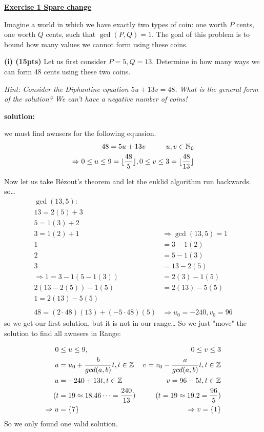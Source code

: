 \documentclass{article}
\begin{document}
\Large
\textbf{\underline{Exercise 1
Spare change}}

Imagine a world in which we have exactly two types of coin: 
one worth $P$ cents, 
one worth $Q$ cents, 
such that $\gcd(P,Q) = 1$. The goal of this
problem is to bound how many values we cannot form using these coins. 


\textbf{(i) (15pts)}
Let us first consider $P = 5, Q = 13$. Determine in how many
ways we can form 48 cents using these two coins.

\textit{
Hint: Consider the Diphantine equation $5u+13v=48$.
What is the general form of the solution? We can't have a negative number of coins!
}

\textbf{solution:} 

we must find awnsers for the following equasion.
\begin{align*}
    48 = 5u + 13v \hspace{1cm} u, v \in \mathbb{N}_{0} \\
    \Rightarrow
    0 \leq u \leq 9 = \lfloor \frac{48}{5} \rfloor, 
    0 \leq v \leq 3 = \lfloor \frac{48}{13} \rfloor
\end{align*}


Now let us take Bézout's theorem and let 
the euklid algorithm run backwards. so\dots
\begin{align*}
    \gcd(13,5): \\
    13 = 2(5) + 3& \\
    5 = 1(3) + 2& \\
    3 = 1(2) + 1& 
    \Rightarrow \gcd(13,5) = 1 \\
    1 &= 3 - 1(2) \\
                 2 &= 5 - 1(3) \\
                 3 &= 13 - 2(5) \\
   \Rightarrow
    1 = 3 - 1(5- 1(3)) &= 2(3) - 1(5)\\
   2(13 - 2(5)) - 1(5) &= 2(13) - 5(5) \\
    1 = 2(13) - 5(5) \\
    \\
    48 = (2 \cdot 48)(13) + (-5 \cdot 48)(5)
        &\Rightarrow u_{0} = -240 , v_{0} = 96
\end{align*}
so we get our first solution, but it is not in our range\dots
So we just "move" the solution to find all awnsers in Range: 

\begin{align*}
    0 &\leq u \leq 9, 
    &0 \leq v \leq 3 \\
    u &= u_{0} + \frac{b}{gcd(a,b)} t , t \in \mathbb{Z}
    &v = v_{0} - \frac{a}{gcd(a,b)} t , 
    t \in \mathbb{Z} \\
    u &= -240 + 13 t , t \in \mathbb{Z} 
    &v = 96 - 5 t , 
    t \in \mathbb{Z} \\
    (t &= 19 \approx 18.46\dots = \frac{240}{13})
    &(t = 19 \approx 19.2 = \frac{96}{5})\\
    \Rightarrow
    u &= \{ 7 \}
    &\Rightarrow
    v = \{ 1 \}
\end{align*}
So we only found one valid solution.
\end{document}
